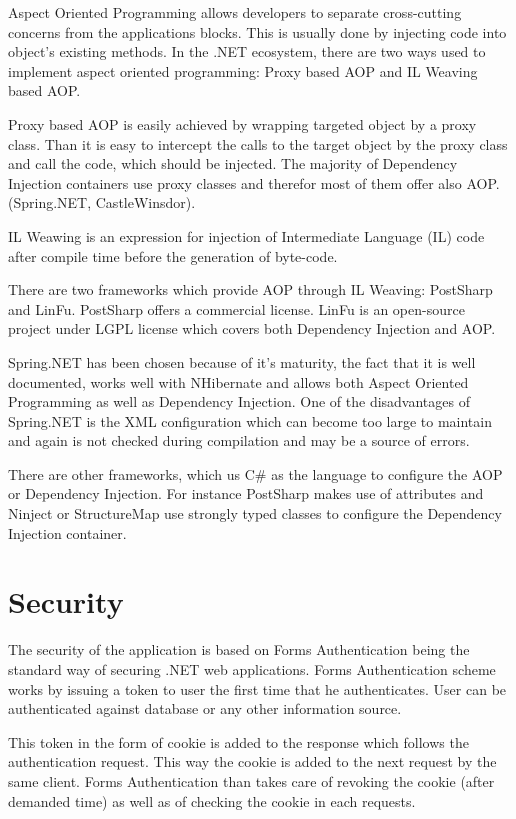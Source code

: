 Aspect Oriented Programming allows developers to separate cross-cutting concerns from the applications blocks. This is usually done by injecting code into object's existing methods.
In the .NET ecosystem, there are two ways used to implement aspect oriented programming: Proxy based AOP and IL Weaving based AOP.

Proxy based AOP is easily achieved by wrapping targeted object by a proxy class. Than it is easy to intercept the calls to the target object by the proxy class and call the code, which should be injected. 
The majority of Dependency Injection containers use proxy classes and therefor most of them offer also AOP. (Spring.NET, CastleWinsdor).

IL Weawing is an expression for injection of Intermediate Language (IL) code after compile time before the generation of byte-code.

There are two frameworks which provide AOP through IL Weaving: PostSharp and LinFu. PostSharp offers a commercial license. LinFu is an open-source project under LGPL license which covers both Dependency Injection and AOP.

Spring.NET has been chosen because of it's maturity, the fact that it is well documented, works well with NHibernate and allows both Aspect Oriented Programming as well as Dependency Injection. One of the disadvantages of Spring.NET is the XML configuration which can become too large to maintain and again is not checked during compilation and may be a source of errors. 

There are other frameworks, which us C\# as the language to configure the AOP or Dependency Injection. For instance PostSharp makes use of attributes and Ninject or StructureMap use strongly typed classes to configure the Dependency Injection container.

\section{Security}
The security of the application is based on Forms Authentication being the standard way of securing .NET web applications. Forms Authentication scheme works by issuing a token to user the first time that he authenticates. User can be authenticated against database or any other information source.

This token in the form of cookie is added to the response which follows the authentication request. This way the cookie is added to the next request by the same client. Forms Authentication than takes care of revoking the cookie (after demanded time)  as well as of checking the cookie in each requests.

